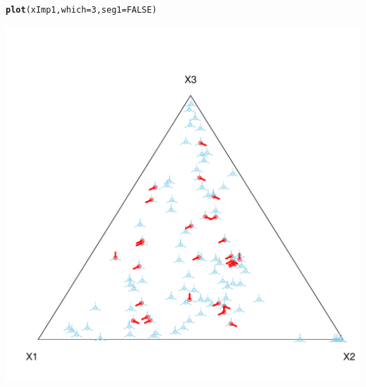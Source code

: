\documentclass{scrartcl}\usepackage[]{graphicx}\usepackage[]{color}
\makeatletter
\def\maxwidth{ %
  \ifdim\Gin@nat@width>\linewidth
    \linewidth
  \else
    \Gin@nat@width
  \fi
}
\newcommand{\hlnum}[1]{\textcolor[rgb]{0.686,0.059,0.569}{#1}}%
\newcommand{\hlstd}[1]{\textcolor[rgb]{0.345,0.345,0.345}{#1}}%
\newcommand{\hlkwc}[1]{\textcolor[rgb]{0.333,0.667,0.333}{#1}}%
\newcommand{\hlkwd}[1]{\textcolor[rgb]{0.737,0.353,0.396}{\textbf{#1}}}%
\newenvironment{kframe}{%
 \def\at@end@of@kframe{}%
 \ifinner\ifhmode%
  \def\at@end@of@kframe{\end{minipage}}%
  \begin{minipage}{\columnwidth}%
 \fi\fi%
 \def\FrameCommand##1{\hskip\@totalleftmargin \hskip-\fboxsep
 \colorbox{shadecolor}{##1}\hskip-\fboxsep
     \hskip-\linewidth \hskip-\@totalleftmargin \hskip\columnwidth}%
 \MakeFramed {\advance\hsize-\width
   \@totalleftmargin\z@ \linewidth\hsize
   \@setminipage}}%
 {\par\unskip\endMakeFramed%
 \at@end@of@kframe}
\newenvironment{knitrout}{}{} %
\makeatother
\begin{document}
\begin{knitrout}
\color{fgcolor}\begin{kframe}
\begin{alltt}
\hlkwd{plot}\hlstd{(xImp1,} \hlkwc{which}\hlstd{=}\hlnum{3}\hlstd{,} \hlkwc{seg1}\hlstd{=}\hlnum{FALSE}\hlstd{)}
\end{alltt}
\end{kframe}
\includegraphics[width=\maxwidth]{figure/unnamed-chunk-6-1} 

\end{knitrout}

\end{document}

